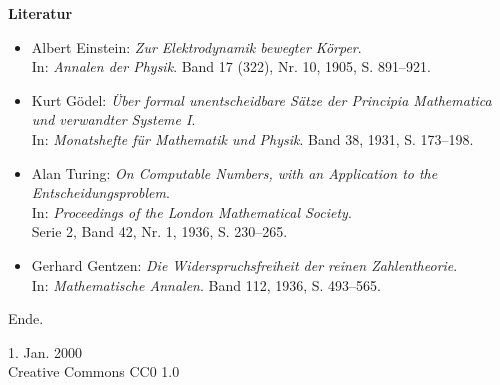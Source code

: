 \documentclass[8pt]{beamer}
\newcommand{\modest}[1]{{\small\color{gray}#1}}
\newcommand{\strong}[1]{\textsf{\textbf{#1}}}
\begin{document}
\begin{frame}[t]
\vspace{3em}
\strong{Literatur}
\begin{itemize}
\item Albert Einstein: \emph{Zur Elektrodynamik bewegter Körper}.\\
In: \emph{Annalen der Physik}. Band 17 (322), Nr. 10, 1905, S. 891--921.

\item Kurt Gödel: \emph{Über formal unentscheidbare Sätze der
Principia Mathematica und verwandter Systeme I}.\\
In: \emph{Monatshefte für Mathematik und Physik}. Band 38, 1931, S. 173--198.

\item Alan Turing: \emph{On Computable Numbers, with an Application
to the Entscheidungsproblem}.\\
In: \emph{Proceedings of the London Mathematical Society}.\\
Serie 2, Band 42, Nr. 1, 1936, S. 230--265.

\item Gerhard Gentzen: \emph{Die Widerspruchsfreiheit der reinen
Zahlentheorie}.\\
In: \emph{Mathematische Annalen}. Band 112, 1936, S. 493--565.
\end{itemize}
\end{frame}

\begin{frame}

{\large Ende.}

\vfill\hfill\modest{1. Jan. 2000}\\
\hfill\modest{Creative Commons CC0 1.0}
\end{frame}
\end{document}
